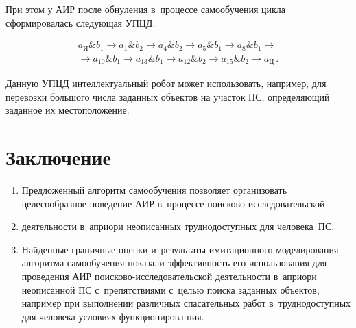 \begin{multicols}{2}
  \noindent
  При этом у АИР после обнуления в~процессе са\-мо\-обуче\-ния цик\-ла 
сформировалась сле\-ду\-ющая \mbox{УПЦД}:

\vspace*{-2pt}

\noindent
  \begin{multline*}
  a_{\mathrm{И}} \& b_1\to a_1 \& b_2\to a_4 \& b_2\to a_5 \& b_1\to a_8 \& 
b_1\to{}\\
  {}\to
  a_{10} \& b_1\to a_{13} \& b_1\to a_{12} \& b_2\to a_{15} \& b_2\to 
a_{\mathrm{Ц}}\,.
  \end{multline*}
  
  Данную УПЦД интеллектуальный робот может использовать, например, для 
перевозки большого чис\-ла заданных объектов на участок ПС, 
опре\-де\-ля\-ющий заданное их мес\-то\-по\-ло\-же\-ние. 


\section{Заключение}

\noindent
\begin{enumerate}[1.]
  \item Предложенный алгоритм са\-мо\-обуче\-ния поз\-во\-ля\-ет организовать 
целесообразное поведение АИР в~процессе  
по\-иско\-во-ис\-сле\-до\-ва\-тель\-ской\linebreak\vspace*{-9.5pt}
\end{enumerate}

\noindent
\begin{enumerate}[1.]
\setcounter{enumi}{1}
\item[\,]
 деятельности в~априори неописанных 
труднодоступных для человека~ПС.
  \item Найденные граничные оценки и~\mbox{результаты} имитационного 
моделирования алгоритма самообуче\-ния показали эф\-фек\-тив\-ность его 
использования для проведения АИР по\-иско\-во-ис\-сле\-до\-ва\-тель\-ской 
деятельности в~априори неописанной ПС с~препятствиями 
с~\mbox{целью} поиска заданных объектов, например при выполнении различных 
спасательных работ в~труд\-но\-до\-ступ\-ных для человека условиях 
функ\-цио\-ни\-ро\-ва-\linebreak ния. 
  \end{enumerate}
   

\end{multicols}
